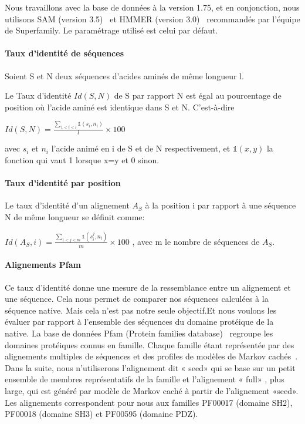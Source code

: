 Nous travaillons avec la base de données à la version 1.75, et en conjonction, nous utilisons SAM (version 3.5)~\citep{refSam} et HMMER (version 3.0)~\citep{refHmmer} recommandés par l'équipe de Superfamily. Le paramétrage utilisé est celui par défaut.

\paragraph{Taux d'identité de séquences}

Soient S et N deux séquences d'acides aminés de même longueur l.

Le Taux d'identité $Id(S,N)$ de S par rapport N est égal au pourcentage de position où l'acide aminé est identique dans S et N. C'est-à-dire

  $ Id(S,N) =\frac{\sum_{1<i<l} \mathds{1}(s_i,n_i)}{l} \times 100$ 

avec $s_i$ et $n_i$ l'acide animé en i de S et de N respectivement, et $\mathds{1}(x,y)$ la fonction qui vaut 1 lorsque x=y et 0 sinon. 

\paragraph{Taux d'identité par position}

Le taux d'identité d'un alignement $A_S$ à la position i par rapport à une séquence N de même longueur se définit comme:

$Id(A_{S},i) = \frac{\sum_{1<j<m} \mathds{1}(s_i^j,n_i)}{m} \times 100$ , avec m le nombre de séquences de $A_S$.

\paragraph{Alignements Pfam} 
Ce taux d'identité donne une mesure de la ressemblance entre un alignement et une séquence. Cela nous permet de comparer nos séquences calculées à la séquence native. Mais cela n'est pas notre seule objectif.Et nous voulons les évaluer par rapport à l'ensemble des séquences du domaine protéique de la native.  
La base de données Pfam (Protein families database)~\citep{refPfam} regroupe les domaines protéiques connus en famille. Chaque famille étant représentée par des alignements multiples de séquences et des profiles de modèles de Markov cachés~\citep{refPfam}. Dans la suite, nous n'utiliserons l'alignement dit « seed» qui se base sur un petit ensemble de membres représentatifs de la famille et l'alignement « full» , plus large, qui est généré par modèle de Markov caché à partir de l'alignement «seed». Les alignements correspondent pour nous aux familles PF00017 (domaine SH2), PF00018  (domaine SH3) et PF00595 (domaine PDZ).

